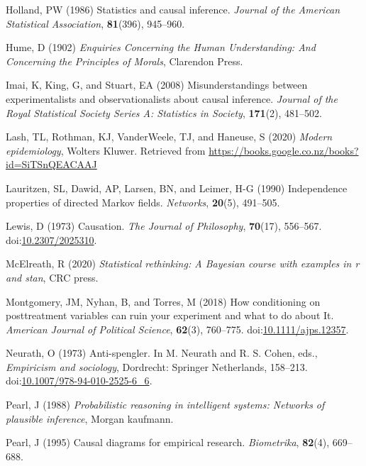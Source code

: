 \documentclass[
  single column]{article}
\newlength{\cslhangindent}
\newenvironment{CSLReferences}[2] %
 {\begin{list}{}{%
  \setlength{\itemindent}{0pt}
  \setlength{\leftmargin}{0pt}
  \setlength{\parsep}{0pt}
  \ifodd #1
   \setlength{\leftmargin}{\cslhangindent}
   \setlength{\itemindent}{-1\cslhangindent}
  \fi
  \setlength{\itemsep}{#2\baselineskip}}}
 {\end{list}}
\begin{document}
\begin{CSLReferences}{1}{0}
Holland, PW (1986) Statistics and causal inference. \emph{Journal of the
American Statistical Association}, \textbf{81}(396), 945--960.

Hume, D (1902) \emph{Enquiries Concerning the Human Understanding: And
Concerning the Principles of Morals}, Clarendon Press.

Imai, K, King, G, and Stuart, EA (2008) Misunderstandings between
experimentalists and observationalists about causal inference.
\emph{Journal of the Royal Statistical Society Series A: Statistics in
Society}, \textbf{171}(2), 481--502.

Lash, TL, Rothman, KJ, VanderWeele, TJ, and Haneuse, S (2020)
\emph{Modern epidemiology}, Wolters Kluwer. Retrieved from
\url{https://books.google.co.nz/books?id=SiTSnQEACAAJ}

Lauritzen, SL, Dawid, AP, Larsen, BN, and Leimer, H-G (1990)
Independence properties of directed {M}arkov fields. \emph{Networks},
\textbf{20}(5), 491--505.

Lewis, D (1973) Causation. \emph{The Journal of Philosophy},
\textbf{70}(17), 556--567.
doi:\href{https://doi.org/10.2307/2025310}{10.2307/2025310}.

McElreath, R (2020) \emph{Statistical rethinking: A {B}ayesian course
with examples in r and stan}, CRC press.

Montgomery, JM, Nyhan, B, and Torres, M (2018) How conditioning on
posttreatment variables can ruin your experiment and what to do about
It. \emph{American Journal of Political Science}, \textbf{62}(3),
760--775.
doi:\href{https://doi.org/10.1111/ajps.12357}{10.1111/ajps.12357}.

Neurath, O (1973) Anti-spengler. In M. Neurath and R. S. Cohen, eds.,
\emph{Empiricism and sociology}, Dordrecht: Springer Netherlands,
158--213.
doi:\href{https://doi.org/10.1007/978-94-010-2525-6_6}{10.1007/978-94-010-2525-6\_6}.

Pearl, J (1988) \emph{Probabilistic reasoning in intelligent systems:
Networks of plausible inference}, Morgan kaufmann.

Pearl, J (1995) Causal diagrams for empirical research.
\emph{Biometrika}, \textbf{82}(4), 669--688.


\end{CSLReferences}
\end{document}
